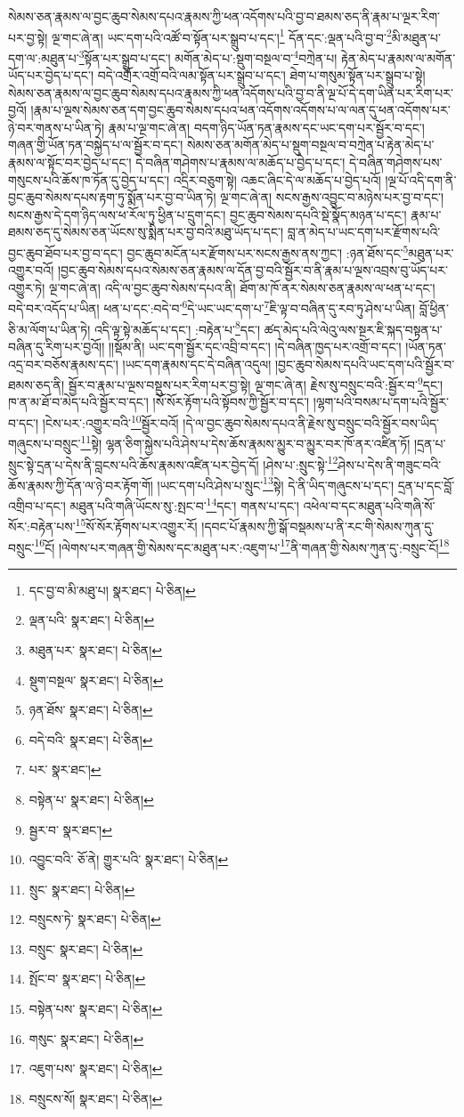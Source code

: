 སེམས་ཅན་རྣམས་ལ་བྱང་ཆུབ་སེམས་དཔའ་རྣམས་ཀྱི་ཕན་འདོགས་པའི་བྱ་བ་ཐམས་ཅད་ནི་རྣམ་པ་ལྔར་རིག་པར་བྱ་སྟེ། ལྔ་གང་ཞེ་ན། ཡང་དག་པའི་འཚོ་བ་སྟོན་པར་སྒྲུབ་པ་དང་།\footnote{དང་བྱ་བ་མི་མཐུ་པ།  སྣར་ཐང་།  པེ་ཅིན། } དོན་དང་:ལྡན་པའི་བྱ་བ་\footnote{ལྡན་པའི་  སྣར་ཐང་།  པེ་ཅིན། }མི་མཐུན་པ་དག་ལ་:མཐུན་པ་\footnote{མཐུན་པར་  སྣར་ཐང་།  པེ་ཅིན། }སྟོན་པར་སྒྲུབ་པ་དང་། མགོན་མེད་པ་:སྡུག་བསྔལ་བ་\footnote{སྡུག་བསྔལ་  སྣར་ཐང་།  པེ་ཅིན། }བཀྲེན་པ། རྟེན་མེད་པ་རྣམས་ལ་མགོན་ཡོད་པར་བྱེད་པ་དང་། བདེ་འགྲོར་འགྲོ་བའི་ལམ་སྟོན་པར་སྒྲུབ་པ་དང་། ཐེག་པ་གསུམ་སྟོན་པར་སྒྲུབ་པ་སྟེ། སེམས་ཅན་རྣམས་ལ་བྱང་ཆུབ་སེམས་དཔའ་རྣམས་ཀྱི་ཕན་འདོགས་པའི་བྱ་བ་ནི་ལྔ་པོ་དེ་དག་ཡིན་པར་རིག་པར་བྱའོ། །རྣམ་པ་ལྔས་སེམས་ཅན་དག་བྱང་ཆུབ་སེམས་དཔའ་ཕན་འདོགས་འདོགས་པ་ལ་ལན་དུ་ཕན་འདོགས་པར་ཉེ་བར་གནས་པ་ཡིན་ཏེ། རྣམ་པ་ལྔ་གང་ཞེ་ན། བདག་ཉིད་ཡོན་ཏན་རྣམས་དང་ཡང་དག་པར་སྦྱོར་བ་དང་། གཞན་གྱི་ཡོན་ཏན་བསྐྱེད་པ་ལ་སྦྱོར་བ་དང་། སེམས་ཅན་མགོན་མེད་པ་སྡུག་བསྔལ་བ་བཀྲེན་པ་རྟེན་མེད་པ་རྣམས་ལ་སྟོང་བར་བྱེད་པ་དང་། དེ་བཞིན་གཤེགས་པ་རྣམས་ལ་མཆོད་པ་བྱེད་པ་དང་། དེ་བཞིན་གཤེགས་པས་གསུངས་པའི་ཆོས་ཁ་ཏོན་དུ་བྱེད་པ་དང་། འདྲིར་བཅུག་སྟེ། འཆང་ཞིང་དེ་ལ་མཆོད་པ་བྱེད་པའོ། །ལྔ་པོ་འདི་དག་ནི་བྱང་ཆུབ་སེམས་དཔས་རྟག་ཏུ་སྨོན་པར་བྱ་བ་ཡིན་ཏེ། ལྔ་གང་ཞེ་ན། སངས་རྒྱས་འབྱུང་བ་མཉེས་པར་བྱ་བ་དང་། སངས་རྒྱས་དེ་དག་ཉིད་ལས་ཕ་རོལ་ཏུ་ཕྱིན་པ་དྲུག་དང་། བྱང་ཆུབ་སེམས་དཔའི་སྡེ་སྣོད་མཉན་པ་དང་། རྣམ་པ་ཐམས་ཅད་དུ་སེམས་ཅན་ཡོངས་སུ་སྨིན་པར་བྱ་བའི་མཐུ་ཡོད་པ་དང་། བླ་ན་མེད་པ་ཡང་དག་པར་རྫོགས་པའི་བྱང་ཆུབ་ཐོབ་པར་བྱ་བ་དང་། བྱང་ཆུབ་མངོན་པར་རྫོགས་པར་སངས་རྒྱས་ནས་ཀྱང་། :ཉན་ཐོས་དང་\footnote{ཉན་ཐོས་  སྣར་ཐང་།  པེ་ཅིན། }མཐུན་པར་འགྱུར་བའོ། །བྱང་ཆུབ་སེམས་དཔའ་སེམས་ཅན་རྣམས་ལ་དོན་བྱ་བའི་སྦྱོར་བ་ནི་རྣམ་པ་ལྔས་འབྲས་བུ་ཡོད་པར་འགྱུར་ཏེ། ལྔ་གང་ཞེ་ན། འདི་ལ་བྱང་ཆུབ་སེམས་དཔའ་ནི། ཐོག་མ་ཁོ་ནར་སེམས་ཅན་རྣམས་ལ་ཕན་པ་དང་། བདེ་བར་འདོད་པ་ཡིན། ཕན་པ་དང་:བདེ་བ་\footnote{བདེ་བའི་  སྣར་ཐང་།  པེ་ཅིན། }དེ་ཡང་ཡང་དག་པ་\footnote{པར་  སྣར་ཐང་། }ཇི་ལྟ་བ་བཞིན་དུ་རབ་ཏུ་ཤེས་པ་ཡིན། བློ་ཕྱིན་ཅི་མ་ལོག་པ་ཡིན་ཏེ། འདི་ལྟ་སྟེ་མཆོད་པ་དང་། :བརྟེན་པ་\footnote{བསྟེན་པ་  སྣར་ཐང་།  པེ་ཅིན། }དང་། ཚད་མེད་པའི་ལེའུ་ལས་སྔར་ཇི་སྐད་བསྟན་པ་བཞིན་དུ་རིག་པར་བྱའོ།། །།སྡོམ་ནི། ཡང་དག་སྦྱོར་དང་འབྲི་བ་དང་། །དེ་བཞིན་ཁྱད་པར་འགྲོ་བ་དང་། །ཡོན་ཏན་འདྲ་བར་བཅོས་རྣམས་དང་། །ཡང་དག་རྣམས་དང་དེ་བཞིན་འདུལ། །བྱང་ཆུབ་སེམས་དཔའི་ཡང་དག་པའི་སྦྱོར་བ་ཐམས་ཅད་ནི། སྦྱོར་བ་རྣམ་པ་ལྔས་བསྡུས་པར་རིག་པར་བྱ་སྟེ། ལྔ་གང་ཞེ་ན། རྗེས་སུ་བསྲུང་བའི་:སྦྱོར་བ་\footnote{སྦྱར་བ་  སྣར་ཐང་། }དང་། ཁ་ན་མ་ཐོ་བ་མེད་པའི་སྦྱོར་བ་དང་། །སོ་སོར་རྟོག་པའི་སྟོབས་ཀྱི་སྦྱོར་བ་དང་། །ལྷག་པའི་བསམ་པ་དག་པའི་སྦྱོར་བ་དང་། །ངེས་པར་:འགྱུར་བའི་\footnote{འབྱུང་བའི་  ཅོ་ནེ། གྱུར་པའི་  སྣར་ཐང་།  པེ་ཅིན། }སྦྱོར་བའོ། །དེ་ལ་བྱང་ཆུབ་སེམས་དཔའ་ནི་རྗེས་སུ་བསྲུང་བའི་སྦྱོར་བས་ཡིད་གཞུངས་པ་བསྲུང་\footnote{སྲུང་  སྣར་ཐང་།  པེ་ཅིན། }སྟེ། ལྷན་ཅིག་སྐྱེས་པའི་ཤེས་པ་དེས་ཆོས་རྣམས་མྱུར་བ་མྱུར་བར་ཁོ་ནར་འཛིན་ཏོ། །དྲན་པ་སྲུང་སྟེ་དྲན་པ་དེས་ནི་བླངས་པའི་ཆོས་རྣམས་འཛིན་པར་བྱེད་དོ། །ཤེས་པ་:སྲུང་སྟེ་\footnote{བསྲུངས་ཏེ་  སྣར་ཐང་།  པེ་ཅིན། }ཤེས་པ་དེས་ནི་གཟུང་བའི་ཆོས་རྣམས་ཀྱི་དོན་ལ་ཉེ་བར་རྟོག་གོ། །ཡང་དག་པའི་ཤེས་པ་སྲུང་\footnote{བསྲུང་  སྣར་ཐང་།  པེ་ཅིན། }སྟེ། དེ་ནི་ཡིད་གཞུངས་པ་དང་། དྲན་པ་དང་བློ་འགྲིབ་པ་དང་། མཐུན་པའི་གཞི་ཡོངས་སུ་:སྤང་བ་\footnote{སྤོང་བ་  སྣར་ཐང་།  པེ་ཅིན། }དང་། གནས་པ་དང་། འཕེལ་བ་དང་མཐུན་པའི་གཞི་སོ་སོར་:བརྟེན་པས་\footnote{བསྟེན་པས་  སྣར་ཐང་།  པེ་ཅིན། }སོ་སོར་རྟོགས་པར་འགྱུར་རོ། །དབང་པོ་རྣམས་ཀྱི་སྒོ་བསྡམས་པ་ནི་རང་གི་སེམས་ཀུན་དུ་བསྲུང་\footnote{གསུང་  སྣར་ཐང་།  པེ་ཅིན། }ངོ། །ལེགས་པར་གཞན་གྱི་སེམས་དང་མཐུན་པར་:འཇུག་པ་\footnote{འཇུག་པས་  སྣར་ཐང་།  པེ་ཅིན། }ནི་གཞན་གྱི་སེམས་ཀུན་དུ་:བསྲུང་ངོ།\footnote{བསྲུངས་སོ།  སྣར་ཐང་།  པེ་ཅིན། } 
